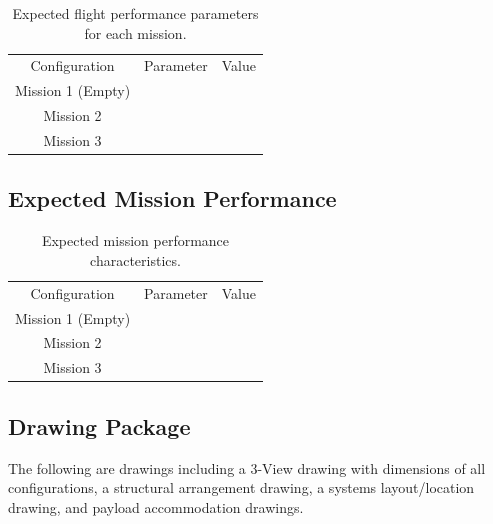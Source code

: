 \documentclass[report]{byu-aero}
\begin{document}
\begin{table}[h!]
	\centering
	\caption{Expected flight performance parameters for each mission.}
	\label{tab:detailflightperformance}
	\begin{tabular}{ c c c } 

		\rowcolor{BYUbluemid}
		Configuration & Parameter & Value \\

		Mission 1 (Empty) &  &  \\

		Mission 2 &  &  \\

		Mission 3 &  &  \\

	\end{tabular}
\end{table}


\subsection{Expected Mission Performance}
\label{ssec:missionperformance}

\begin{table}[h!]
	\centering
	\caption{Expected mission performance characteristics.}
	\label{tab:detailmissionperformance}
	\begin{tabular}{ c c c } 

		\rowcolor{BYUbluemid}
		Configuration & Parameter & Value \\

		Mission 1 (Empty) &  &  \\

		Mission 2 &  &  \\

		Mission 3 &  &  \\

	\end{tabular}
\end{table}


\subsection{Drawing Package}
\label{ssec:drawings}

The following are drawings including a 3-View drawing with dimensions of all configurations, a structural arrangement drawing, a systems layout/location drawing, and payload accommodation drawings.
\end{document}
